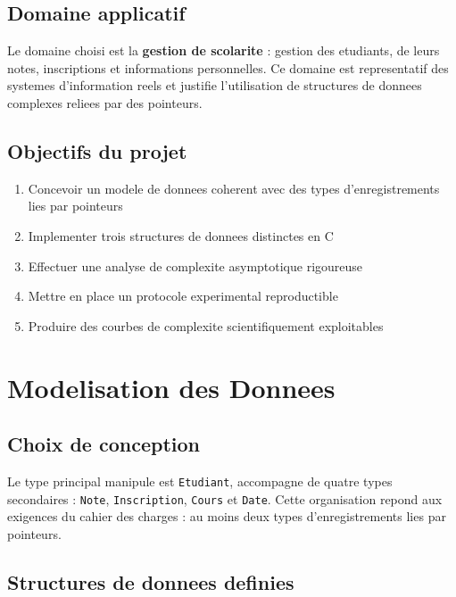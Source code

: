\documentclass[12pt,a4paper]{article}
\begin{document}
\subsection{Domaine applicatif}

Le domaine choisi est la \textbf{gestion de scolarite} : gestion des
etudiants, de leurs notes, inscriptions et informations personnelles.
Ce domaine est representatif des systemes d'information reels et
justifie l'utilisation de structures de donnees complexes reliees
par des pointeurs.

\subsection{Objectifs du projet}

\begin{enumerate}
    \item Concevoir un modele de donnees coherent avec des types
          d'enregistrements lies par pointeurs
    \item Implementer trois structures de donnees distinctes en C
    \item Effectuer une analyse de complexite asymptotique rigoureuse
    \item Mettre en place un protocole experimental reproductible
    \item Produire des courbes de complexite scientifiquement exploitables
\end{enumerate}

\section{Modelisation des Donnees}

\subsection{Choix de conception}

Le type principal manipule est \texttt{Etudiant}, accompagne de quatre
types secondaires : \texttt{Note}, \texttt{Inscription}, \texttt{Cours}
et \texttt{Date}. Cette organisation repond aux exigences du cahier
des charges : au moins deux types d'enregistrements lies par pointeurs.

\subsection{Structures de donnees definies}
\end{document}
